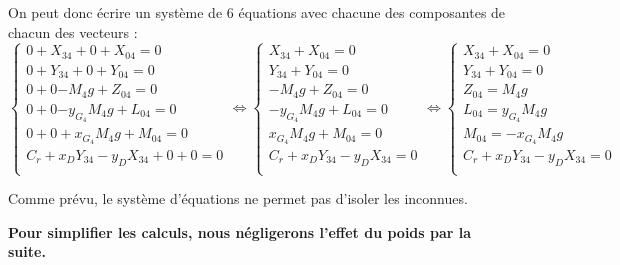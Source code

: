 \documentclass[10pt]{article}
\begin{document}
On peut donc écrire un système de 6 équations avec chacune des composantes de chacun des vecteurs :
$$
\left\{
\begin{array}{l}
{0}+{X_{34}}+{0}+{X_{04}}=0 \\
{0}+{Y_{34}}+{0}+{Y_{04}}=0 \\
{0}+{0}{-M_4g}+{Z_{04}}=0 \\
{0}+{0}{-y_{G_4}M_4g}+{L_{04}}=0 \\
{0}+{0}+{x_{G_4}M_4g}+{M_{04}}=0 \\
{C_r}+{x_DY_{34}-y_DX_{34}}+{0}+{0}=0 \\
\end{array}
\right.
\Longleftrightarrow
\left\{
\begin{array}{l}
{X_{34}}+{X_{04}}=0 \\
{Y_{34}}+{Y_{04}}=0 \\
{-M_4g}+{Z_{04}}=0 \\
{-y_{G_4}M_4g}+{L_{04}}=0 \\
{x_{G_4}M_4g}+{M_{04}}=0 \\
{C_r}+{x_DY_{34}-y_DX_{34}}=0 \\
\end{array}
\right.
\Longleftrightarrow
\left\{
\begin{array}{l}
{X_{34}}+{X_{04}}=0 \\
{Y_{34}}+{Y_{04}}=0 \\
{Z_{04}}=M_4g \\
{L_{04}}={y_{G_4}M_4g}\\
{M_{04}}=- {x_{G_4}M_4g}\\
{C_r}+{x_DY_{34}-y_DX_{34}}=0 \\
\end{array}
\right.
$$

Comme prévu, le système d'équations ne permet pas d'isoler les inconnues.

\textbf{Pour simplifier les calculs, nous négligerons l'effet du poids par la suite.}
\end{document}
